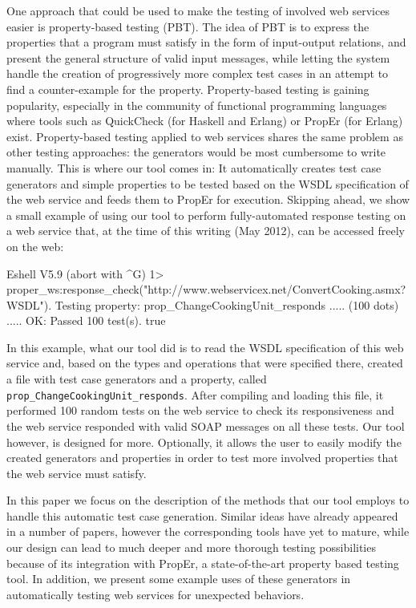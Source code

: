 \documentclass[copyright]{eptcs}
\begin{document}
One approach that could be used to make the testing of involved web
services easier is property-based testing (PBT). The idea of PBT is to
express the properties that a program must satisfy in the form of
input-output relations, and present the general structure of valid
input messages, while letting the system handle the creation of
progressively more complex test cases in an attempt to find a
counter-example for the property. Property-based testing is gaining
popularity, especially in the community of functional programming
languages where tools such as QuickCheck (for Haskell and Erlang) or
PropEr (for Erlang) exist.
%
Property-based testing applied to web services shares the same problem
as other testing approaches: the generators would be most cumbersome
to write manually. This is where our tool comes in: It automatically
creates test case generators and simple properties to be tested based
on the WSDL specification of the web service and feeds them to PropEr
for execution.
%
Skipping ahead, we show a small example of using our tool to perform
fully-automated response testing on a web service that, at the time of
this writing (May 2012), can be accessed freely on the web:

\begin{lstoutput}
Eshell V5.9 (abort with ^G)
1> proper_ws:response_check("http://www.webservicex.net/ConvertCooking.asmx?WSDL").
Testing property: prop_ChangeCookingUnit_responds
..... (100 dots) .....
OK: Passed 100 test(s).
true
\end{lstoutput}

In this example, what our tool did is to read the WSDL specification
of this web service and, based on the types and operations that were
specified there, created a file with test case generators and a
property, called \texttt{prop\_ChangeCookingUnit\_responds}. After
compiling and loading this file, it performed 100 random tests on the
web service to check its responsiveness and the web service responded
with valid SOAP messages on all these tests. Our tool however, is
designed for more. Optionally, it allows the user to easily modify the
created generators and properties in order to test more involved
properties that the web service must satisfy.


In this paper we focus on the description of the methods that our tool
employs to handle this automatic test case generation. Similar ideas
have already appeared in a number of papers, however the corresponding
tools have yet to mature, while our design can lead to much deeper and
more thorough testing possibilities because of its integration with
PropEr, a state-of-the-art property based testing tool. In addition,
we present some example uses of these generators in automatically
testing web services for unexpected behaviors.
\end{document}
